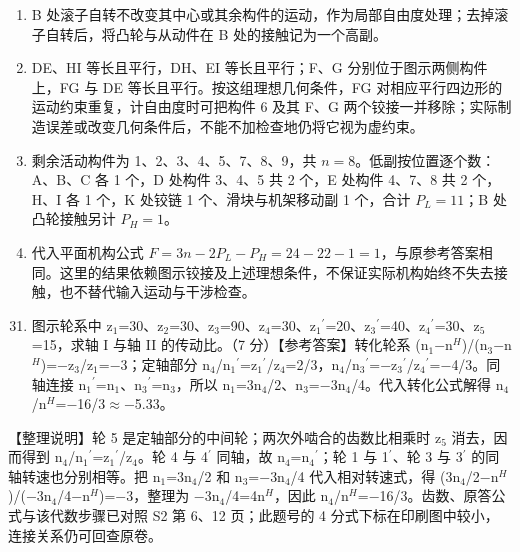 \documentclass[zihao=5,a4paper,UTF8,fontset=fandol]{ctexart}
\begin{document}
\begin{enumerate}
\item 
B 处滚子自转不改变其中心或其余构件的运动，作为局部自由度处理；去掉滚子自转后，将凸轮与从动件在 B 处的接触记为一个高副。


\item 
DE、HI 等长且平行，DH、EI 等长且平行；F、G 分别位于图示两侧构件上，FG 与 DE 等长且平行。按这组理想几何条件，FG 对相应平行四边形的运动约束重复，计自由度时可把构件 6 及其 F、G 两个铰接一并移除；实际制造误差或改变几何条件后，不能不加检查地仍将它视为虚约束。


\item 
剩余活动构件为 1、2、3、4、5、7、8、9，共 $n=8$。低副按位置逐个数：A、B、C 各 1 个，D 处构件 3、4、5 共 2 个，E 处构件 4、7、8 共 2 个，H、I 各 1 个，K 处铰链 1 个、滑块与机架移动副 1 个，合计 $P_L=11$；B 处凸轮接触另计 $P_H=1$。


\item 
代入平面机构公式 $F=3n-2P_L-P_H=24-22-1=1$，与原参考答案相同。这里的结果依赖图示铰接及上述理想条件，不保证实际机构始终不失去接触，也不替代输入运动与干涉检查。



\end{enumerate}

\par




\begin{enumerate}
\setcounter{enumi}{30}
\item 
图示轮系中 z$_{1}$=30、z$_{2}$=30、z$_{3}$=90、z$_{4}$=30、z$_{1}$${}^{\prime}$=20、z$_{3}$${}^{\prime}$=40、z$_{4}$${}^{\prime}$=30、z$_{5}$=15，求轴 I 与轴 II 的传动比。（7 分）【参考答案】转化轮系 (n$_{1}$$-$n$^{H}$)/(n$_{3}$$-$n$^{H}$)=$-$z$_{3}$/z$_{1}$=$-$3；定轴部分 n$_{4}$/n$_{1}$${}^{\prime}$=z$_{1}$${}^{\prime}$/z$_{4}$=2/3，n$_{4}$/n$_{3}$${}^{\prime}$=$-$z$_{3}$${}^{\prime}$/z$_{4}$${}^{\prime}$=$-$4/3。同轴连接 n$_{1}$${}^{\prime}$=n$_{1}$、n$_{3}$${}^{\prime}$=n$_{3}$，所以 n$_{1}$=3n$_{4}$/2、n$_{3}$=$-$3n$_{4}$/4。代入转化公式解得 n$_{4}$/n$^{H}$=$-$16/3$\approx$$-$5.33。



\end{enumerate}

【整理说明】轮 5 是定轴部分的中间轮；两次外啮合的齿数比相乘时 z$_{5}$ 消去，因而得到 n$_{4}$/n$_{1}$${}^{\prime}$=z$_{1}$${}^{\prime}$/z$_{4}$。轮 4 与 4${}^{\prime}$ 同轴，故 n$_{4}$=n$_{4}$${}^{\prime}$；轮 1 与 1${}^{\prime}$、轮 3 与 3${}^{\prime}$ 的同轴转速也分别相等。把 n$_{1}$=3n$_{4}$/2 和 n$_{3}$=$-$3n$_{4}$/4 代入相对转速式，得 (3n$_{4}$/2$-$n$^{H}$)/($-$3n$_{4}$/4$-$n$^{H}$)=$-$3，整理为 $-$3n$_{4}$/4=4n$^{H}$，因此 n$_{4}$/n$^{H}$=$-$16/3。齿数、原答公式与该代数步骤已对照 S2 第 6、12 页；此题号的 4 分式下标在印刷图中较小，连接关系仍可回查原卷。
\end{document}
